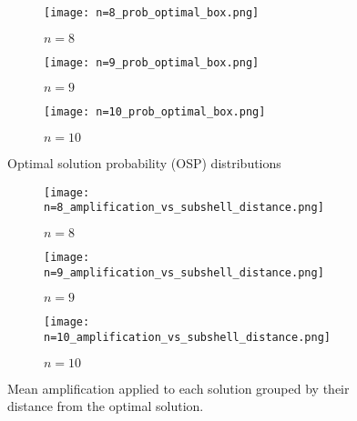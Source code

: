 \begin{figure}
     \centering
     \begin{subfigure}{0.45\textwidth}
         \centering
         \texttt{[image: n=8\_prob\_optimal\_box.png]}
         \caption{$n=8$}
         \label{fig:osp 8}
     \end{subfigure}
     \hfill
     \begin{subfigure}{0.45\textwidth}
         \centering
         \texttt{[image: n=9\_prob\_optimal\_box.png]}
         \caption{$n=9$}
         \label{fig:osp 9}
     \end{subfigure}
     \hfill
     \begin{subfigure}{\textwidth}
         \centering
         \texttt{[image: n=10\_prob\_optimal\_box.png]}
         \caption{$n=10$}
         \label{fig:osp 10}
     \end{subfigure}
        \caption{Optimal solution probability (OSP) distributions}
        \label{fig:osp}
\end{figure}


\begin{figure}
     \centering
     \begin{subfigure}{0.45\textwidth}
         \centering
         \texttt{[image: n=8\_amplification\_vs\_subshell\_distance.png]}
         \caption{$n=8$}
         \label{fig:amp vs sub 8}
     \end{subfigure}
     \hfill
     \begin{subfigure}{0.45\textwidth}
         \centering
         \texttt{[image: n=9\_amplification\_vs\_subshell\_distance.png]}
         \caption{$n=9$}
         \label{fig:amp vs sub 9}
     \end{subfigure}
     \hfill
     \begin{subfigure}{\textwidth}
         \centering
         \texttt{[image: n=10\_amplification\_vs\_subshell\_distance.png]}
         \caption{$n=10$}
         \label{fig:amp vs sub 10}
     \end{subfigure}
        \caption{Mean amplification applied to each solution grouped by their distance from the optimal solution.}
        \label{fig:amp vs sub}
\end{figure}